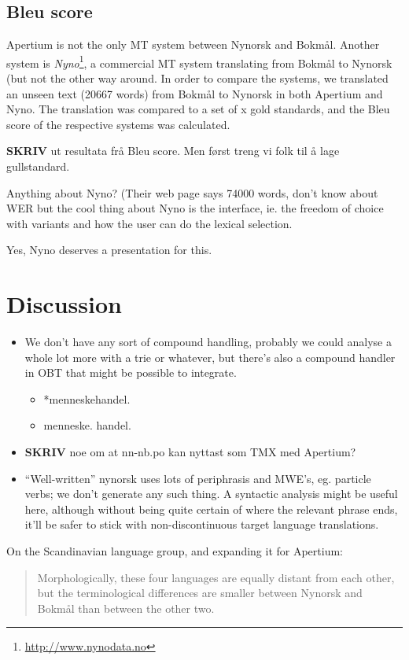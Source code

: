 \documentclass[11pt]{article}
\begin{document}
\subsection{Bleu score}

Apertium is not the only MT system between Nynorsk and Bokmål. Another
system is
\textit{Nyno}\footnote{\href{http://www.nynodata.no}{http://www.nynodata.no}},
a commercial MT system translating from Bokmål to Nynorsk (but not the
other way around. In order to compare the systems, we translated an
unseen text (20667 words) from Bokmål to Nynorsk in both Apertium and
Nyno. The translation was compared to a set of x gold standards, and
the Bleu score of the respective systems was calculated.

\textbf{SKRIV} ut resultata frå Bleu score. Men først treng vi folk til å lage gullstandard.

Anything about Nyno? (Their web page says 74000 words, don't know
  about WER but the cool thing about Nyno is the interface, ie. the
  freedom of choice with variants and how the user can do the lexical
  selection.
  
  Yes, Nyno deserves a presentation for this.

\section{Discussion}

\begin{itemize}
\item We don't have any sort of compound handling, probably we could
  analyse a whole lot more with a trie or whatever, but there's also a
  compound handler in OBT that might be possible to integrate.

\begin{itemize}
\item *menneskehandel.
\item menneske. handel.
\end{itemize}
\item \textbf{SKRIV} noe om at nn-nb.po kan nyttast som TMX med Apertium?

\item ``Well-written'' nynorsk uses lots of periphrasis and MWE's, eg. particle
  verbs; we don't generate any such thing. A syntactic analysis might
  be useful here, although without being quite certain of where the
  relevant phrase ends, it'll be safer to stick with non-discontinuous
  target language translations.
\end{itemize}
On the Scandinavian language group, and expanding it for Apertium:
\begin{quote}
Morphologically, these four languages are equally distant from each
other, but the terminological differences are smaller between Nynorsk
and Bokmål than between the other two. \\
\citep{everson2000sln}
\end{quote}
\end{document}
